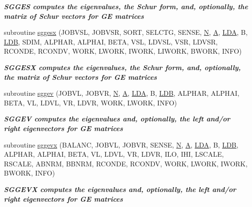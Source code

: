 \begin{DoxyCompactItemize}
\begin{DoxyCompactList}\small\item\em {\bfseries  S\+G\+G\+E\+S computes the eigenvalues, the Schur form, and, optionally, the matrix of Schur vectors for G\+E matrices} \end{DoxyCompactList}\item 
subroutine \hyperlink{group__realGEeigen_gac04eec62b6a153d74e425961e9704fde}{sggesx} (J\+O\+B\+V\+S\+L, J\+O\+B\+V\+S\+R, S\+O\+R\+T, S\+E\+L\+C\+T\+G, S\+E\+N\+S\+E, \hyperlink{polmisc_8c_a0240ac851181b84ac374872dc5434ee4}{N}, \hyperlink{classA}{A}, \hyperlink{example__user_8c_ae946da542ce0db94dced19b2ecefd1aa}{L\+D\+A}, B, \hyperlink{example__user_8c_a50e90a7104df172b5a89a06c47fcca04}{L\+D\+B}, S\+D\+I\+M, A\+L\+P\+H\+A\+R, A\+L\+P\+H\+A\+I, B\+E\+T\+A, V\+S\+L, L\+D\+V\+S\+L, V\+S\+R, L\+D\+V\+S\+R, R\+C\+O\+N\+D\+E, R\+C\+O\+N\+D\+V, W\+O\+R\+K, L\+W\+O\+R\+K, I\+W\+O\+R\+K, L\+I\+W\+O\+R\+K, B\+W\+O\+R\+K, I\+N\+F\+O)
\begin{DoxyCompactList}\small\item\em {\bfseries  S\+G\+G\+E\+S\+X computes the eigenvalues, the Schur form, and, optionally, the matrix of Schur vectors for G\+E matrices} \end{DoxyCompactList}\item 
subroutine \hyperlink{group__realGEeigen_ga6176eadcb5a027beb0b000fbf74f9e35}{sggev} (J\+O\+B\+V\+L, J\+O\+B\+V\+R, \hyperlink{polmisc_8c_a0240ac851181b84ac374872dc5434ee4}{N}, \hyperlink{classA}{A}, \hyperlink{example__user_8c_ae946da542ce0db94dced19b2ecefd1aa}{L\+D\+A}, B, \hyperlink{example__user_8c_a50e90a7104df172b5a89a06c47fcca04}{L\+D\+B}, A\+L\+P\+H\+A\+R, A\+L\+P\+H\+A\+I, B\+E\+T\+A, V\+L, L\+D\+V\+L, V\+R, L\+D\+V\+R, W\+O\+R\+K, L\+W\+O\+R\+K, I\+N\+F\+O)
\begin{DoxyCompactList}\small\item\em {\bfseries  S\+G\+G\+E\+V computes the eigenvalues and, optionally, the left and/or right eigenvectors for G\+E matrices} \end{DoxyCompactList}\item 
subroutine \hyperlink{group__realGEeigen_ga47ddf03d427ec3f9346253132c26cf96}{sggevx} (B\+A\+L\+A\+N\+C, J\+O\+B\+V\+L, J\+O\+B\+V\+R, S\+E\+N\+S\+E, \hyperlink{polmisc_8c_a0240ac851181b84ac374872dc5434ee4}{N}, \hyperlink{classA}{A}, \hyperlink{example__user_8c_ae946da542ce0db94dced19b2ecefd1aa}{L\+D\+A}, B, \hyperlink{example__user_8c_a50e90a7104df172b5a89a06c47fcca04}{L\+D\+B}, A\+L\+P\+H\+A\+R, A\+L\+P\+H\+A\+I, B\+E\+T\+A, V\+L, L\+D\+V\+L, V\+R, L\+D\+V\+R, I\+L\+O, I\+H\+I, L\+S\+C\+A\+L\+E, R\+S\+C\+A\+L\+E, A\+B\+N\+R\+M, B\+B\+N\+R\+M, R\+C\+O\+N\+D\+E, R\+C\+O\+N\+D\+V, W\+O\+R\+K, L\+W\+O\+R\+K, I\+W\+O\+R\+K, B\+W\+O\+R\+K, I\+N\+F\+O)
\begin{DoxyCompactList}\small\item\em {\bfseries  S\+G\+G\+E\+V\+X computes the eigenvalues and, optionally, the left and/or right eigenvectors for G\+E matrices} \end{DoxyCompactList}\end{DoxyCompactItemize}


